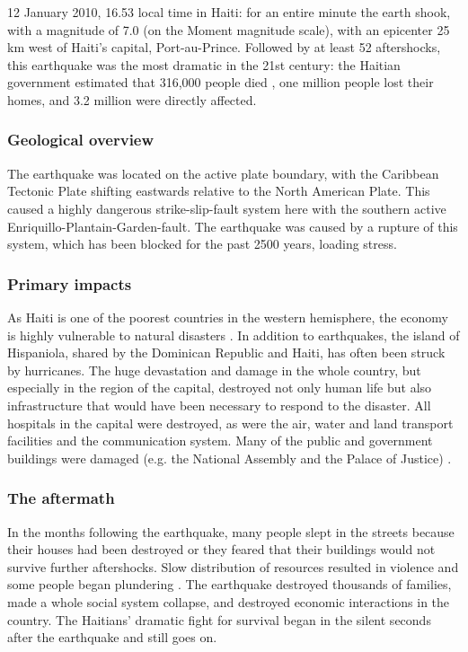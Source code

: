 \documentclass[11pt]{article}
\begin{document}
12 January 2010, 16.53 local time in Haiti: for an entire minute the earth shook, with a magnitude of 7.0 (on the Moment magnitude scale), with an epicenter 25 km west of Haiti's capital, Port-au-Prince. \cite{nyt:mag} Followed by at least 52 aftershocks,  this earthquake was the most dramatic in the 21st century: the Haitian government estimated that 316,000 people died \cite{web:cbc1}, one million people lost their homes, and 3.2 million were directly affected. \cite{web:ear}

\subsubsection*{Geological overview}
The earthquake was located on the active plate boundary, with the Caribbean Tectonic Plate shifting eastwards relative to the North American Plate. This caused a highly dangerous strike-slip-fault system here with the southern active Enriquillo-Plantain-Garden-fault. The earthquake was caused by a rupture of this system, which has been blocked for the past 2500 years, loading stress. \cite{web:bbc1}

\subsubsection*{Primary impacts}
As Haiti is one of the poorest countries in the western hemisphere, the economy is highly vulnerable to natural disasters \cite{web:unicef}. In addition to earthquakes, the island of Hispaniola, shared by the Dominican Republic and Haiti, has often been struck by hurricanes. The huge devastation and damage in the whole country, but especially in the region of the capital, destroyed not only human life but also infrastructure that would have been necessary to respond to the disaster. All hospitals in the capital were destroyed, as were the air, water and land transport facilities and the communication system. Many of the public and government buildings were damaged (e.g. the National Assembly and the Palace of Justice) \cite{web:wikipedia_infra}.


\subsubsection*{The aftermath}
In the months following the earthquake, many people slept in the streets because their houses had been destroyed or they feared that their buildings would not survive further aftershocks. Slow distribution of resources resulted in violence and some people began plundering \cite{wikipedia:map}. The earthquake destroyed thousands of families, made a whole social system collapse, and destroyed economic interactions in the country. The Haitians' dramatic fight for survival began in the silent seconds after the earthquake and still goes on.
\end{document}
